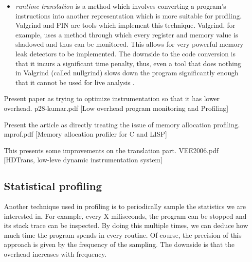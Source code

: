 \begin{itemize}
\begin{itemize}
\item \textit{runtime translation} is a method which involves converting a program's instructions into another representation which is more suitable for profiling. Valgrind\cite{Nethercote07} and PIN\cite{Luk05} are tools which implement this technique. Valgrind, for example, uses a method through which every register and memory value is shadowed and thus can be monitored. This allows for very powerful memory leak detectors to be implemented. The downside to the code conversion is that it incurs a significant time penalty, thus, even a tool that does nothing in Valgrind (called nullgrind) slows down the program significantly enough that it cannot be used for live analysis \cite{Newsome05}.
\end{itemize}
\end{itemize}

Present paper as trying to optimize instrumentation so that it has lower overhead.
p28-kumar.pdf [Low overhead program monitoring and Profiling]

Present the article as directly treating the issue of memory allocation profiling.
mprof.pdf [Memory allocation profiler for C and LISP]

This presents some improvements on the translation part.
VEE2006.pdf [HDTrans, low-leve dynamic instrumentation system]

\subsection{Statistical profiling}
\label{subsection:statisticalprofiling}

Another technique used in profiling is to periodically sample the statistics we are interested in. For example, every X miliseconds, the program can be stopped and its stack trace can be inspected. By doing this  multiple times, we can deduce how much time the program spends in every routine. Of course, the precision of this approach is given by the frequency of the sampling. The downside is that the overhead increases with frequency.

